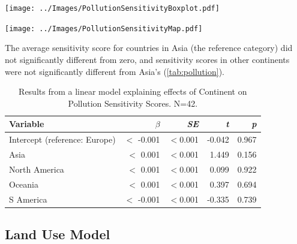 \documentclass[11pt, a4paper, titlepage]{article}
\begin{document}
	\begin{center}
		
		\texttt{[image: ../Images/PollutionSensitivityBoxplot.pdf]}
		\label{figure:pollutionbox}
		
		\texttt{[image: ../Images/PollutionSensitivityMap.pdf]}
		\label{figure:pollutionmap}
		

	\end{center}
	The average sensitivity score for countries in Asia (the reference category) did not significantly different from zero, and sensitivity scores in other continents were not significantly different from Asia's (\autoref{tab:pollution}).
	
		\begin{table}[H]
		\begin{center}
			\caption{Results from a linear model explaining effects of Continent on Pollution Sensitivity Scores. \textmd{ N=42.}}
			\label{tab:pollution}
			\begin{tabular}{l|r|r|r|r} %
				Variable & $\beta$ & \textit{SE} & \textit{t} & \textit{p}\\
				\hline
				Intercept (reference: Europe) & $<$ -0.001 & $<$0.001 & -0.042 & 0.967\\
				Asia & $<$ 0.001 & $<$0.001 & 1.449 & 0.156 \\
				North America & $<$ 0.001 & $<$0.001 & 0.099 & 0.922\\
				Oceania & $<$ 0.001 & $<$0.001 & 0.397 & 0.694\\
				S America & $<$ -0.001 & $<$0.001 & -0.335 & 0.739\\
			\end{tabular}
		\end{center}
	\end{table}

\newpage
	\subsection*{Land Use Model}
	
\end{document}
